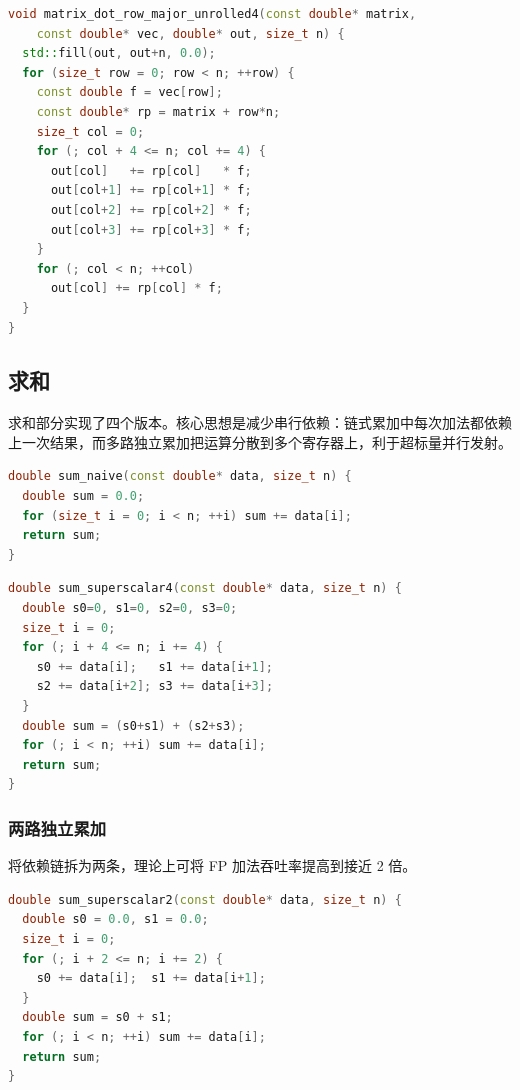 \documentclass[a4paper,11pt,UTF8]{ctexart}
\begin{document}
\begin{lstlisting}[language=C++,caption=行优先 + 4 路展开]
void matrix_dot_row_major_unrolled4(const double* matrix,
    const double* vec, double* out, size_t n) {
  std::fill(out, out+n, 0.0);
  for (size_t row = 0; row < n; ++row) {
    const double f = vec[row];
    const double* rp = matrix + row*n;
    size_t col = 0;
    for (; col + 4 <= n; col += 4) {
      out[col]   += rp[col]   * f;
      out[col+1] += rp[col+1] * f;
      out[col+2] += rp[col+2] * f;
      out[col+3] += rp[col+3] * f;
    }
    for (; col < n; ++col)
      out[col] += rp[col] * f;
  }
}
\end{lstlisting}

\subsection{求和}
求和部分实现了四个版本。核心思想是减少串行依赖：链式累加中每次加法都依赖上一次结果，而多路独立累加把运算分散到多个寄存器上，利于超标量并行发射。

\begin{lstlisting}[language=C++,caption=链式累加]
double sum_naive(const double* data, size_t n) {
  double sum = 0.0;
  for (size_t i = 0; i < n; ++i) sum += data[i];
  return sum;
}
\end{lstlisting}

\begin{lstlisting}[language=C++,caption=四路独立累加]
double sum_superscalar4(const double* data, size_t n) {
  double s0=0, s1=0, s2=0, s3=0;
  size_t i = 0;
  for (; i + 4 <= n; i += 4) {
    s0 += data[i];   s1 += data[i+1];
    s2 += data[i+2]; s3 += data[i+3];
  }
  double sum = (s0+s1) + (s2+s3);
  for (; i < n; ++i) sum += data[i];
  return sum;
}
\end{lstlisting}

\subsubsection{两路独立累加}
将依赖链拆为两条，理论上可将 FP 加法吞吐率提高到接近 2 倍。

\begin{lstlisting}[language=C++,caption=两路独立累加]
double sum_superscalar2(const double* data, size_t n) {
  double s0 = 0.0, s1 = 0.0;
  size_t i = 0;
  for (; i + 2 <= n; i += 2) {
    s0 += data[i];  s1 += data[i+1];
  }
  double sum = s0 + s1;
  for (; i < n; ++i) sum += data[i];
  return sum;
}
\end{lstlisting}
\end{document}
